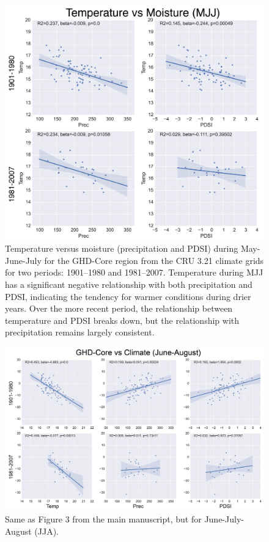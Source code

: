 \documentclass[12pt]{article}
\begin{document}
\begin{figure}
\center
\includegraphics[width=1.0\columnwidth,scale=2]{SUPP_fig_12_temp_vs_moist_MJJ.png}
\caption{Temperature versus moisture (precipitation and PDSI) during May-June-July for the GHD-Core region from the CRU 3.21 climate grids for two periods: 1901--1980 and 1981--2007. Temperature during MJJ has a significant negative relationship with both precipitation and PDSI, indicating the tendency for warmer conditions during drier years. Over the more recent period, the relationship between temperature and PDSI breaks down, but the relationship with precipitation remains largely consistent.}
\end{figure}

\begin{figure}
\center
\includegraphics[width=1.0\columnwidth,scale=2]{SUPP_fig_13_JJA_clim_regplots.png}
\caption{Same as Figure 3 from the main manuscript, but for June-July-August (JJA).}
\end{figure}
\end{document}
